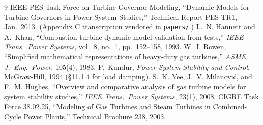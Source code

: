 \documentclass[11pt]{article}
\begin{document}
\begin{thebibliography}{9}
 IEEE PES Task Force on Turbine-Governor Modeling,
``Dynamic Models for Turbine-Governors in Power System Studies,''
Technical Report PES-TR1, Jan.\ 2013. (Appendix C transcription vendored
in \texttt{papers/}.)
 L.~N. Hannett and A.~Khan, ``Combustion turbine dynamic
model validation from tests,'' \emph{IEEE Trans.\ Power Systems},
vol.~8, no.~1, pp.~152--158, 1993.
 W.~I. Rowen, ``Simplified mathematical representations of
heavy-duty gas turbines,'' \emph{ASME J.\ Eng.\ Power}, 105(4), 1983.
 P.~Kundur, \emph{Power System Stability and Control},
McGraw-Hill, 1994 (\S11.1.4 for load damping).
 S.~K. Yee, J.~V. Milanovi\'c, and F.~M. Hughes, ``Overview
and comparative analysis of gas turbine models for system stability
studies,'' \emph{IEEE Trans.\ Power Systems}, 23(1), 2008.
 CIGRE Task Force 38.02.25, ``Modeling of Gas Turbines and
Steam Turbines in Combined-Cycle Power Plants,'' Technical Brochure 238,
2003.
\end{thebibliography}
\end{document}
